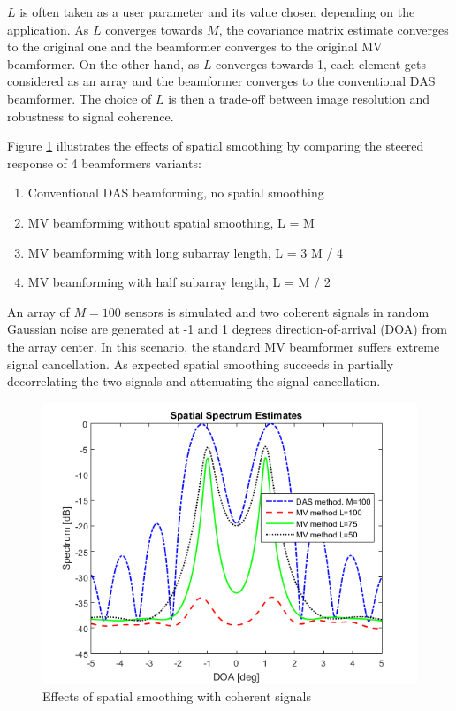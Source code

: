 $L$ is often taken as a user parameter and its value chosen depending on the application. As $L$ converges towards $M$, the covariance matrix estimate converges to the original one and the beamformer converges to the original MV beamformer. On the other hand, as $L$ converges towards 1, each element gets considered as an array and the beamformer converges to the conventional DAS beamformer. The choice of $L$ is then a trade-off between image resolution and robustness to signal coherence.
\par
Figure \ref{fig:spatial_smoothing} illustrates the effects of spatial smoothing by comparing the steered response of 4 beamformers variants:
\begin{enumerate}
    \item Conventional DAS beamforming, no spatial smoothing
    \item MV beamforming without spatial smoothing, L = M
    \item MV beamforming with long subarray length, L = 3 M / 4
    \item MV beamforming with half subarray length, L = M / 2
\end{enumerate}

\noindent
An array of $M=100$ sensors is simulated and two coherent signals in random Gaussian noise are generated at -1 and 1 degrees direction-of-arrival (DOA) from the array center. In this scenario, the standard MV beamformer suffers extreme signal cancellation. As expected spatial smoothing succeeds in partially decorrelating the two signals and attenuating the signal cancellation.

\begin{figure}[ht]
    \centering
    \includegraphics[width=\linewidth]{./images/background/spatial_averaging.png}
    \caption{Effects of spatial smoothing with coherent signals}
    \label{fig:spatial_smoothing}
\end{figure}


